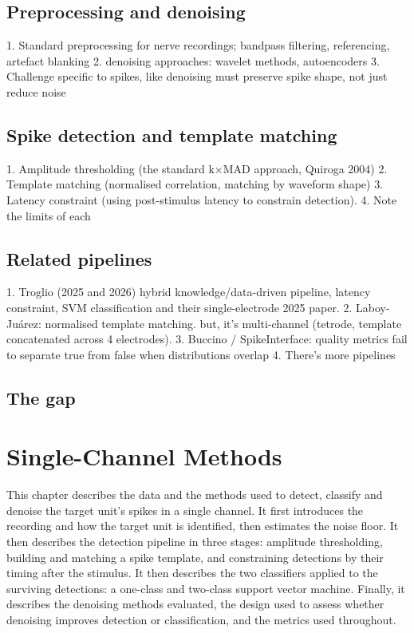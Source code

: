 \documentclass[ %
                    author={Daniel Page},
                supervisor={Dr. Andrew Calway},
                    degree={MSc},
                     title={Some Structural Guidelines for Data Science MSc Theses, Including Those With Long Titles that Run Across Multiple Lines on the Front Page},
                  subtitle={And those including an optional subtitle too, for good measure},
                      type={},
                      year={2021}]{dissertation}
\begin{document}
\section{Preprocessing and denoising}
1. Standard preprocessing for nerve recordings; bandpass filtering, referencing, artefact blanking 
2. denoising approaches: wavelet methods, autoencoders
3. Challenge specific to spikes, like denoising must preserve spike shape, not just reduce noise
\section{Spike detection and template matching}
1. Amplitude thresholding (the standard k×MAD approach, Quiroga 2004)
2. Template matching (normalised correlation, matching by waveform shape)
3. Latency constraint (using post-stimulus latency to constrain detection).
4. Note the limits of each 
\section{Related pipelines}
1. Troglio (2025 and 2026) hybrid knowledge/data-driven pipeline, latency constraint, SVM classification and their single-electrode 2025 paper.
2. Laboy-Juárez: normalised template matching. but, it's multi-channel (tetrode, template concatenated across 4 electrodes).
3. Buccino / SpikeInterface: quality metrics fail to separate true from false when distributions overlap
4. There's more pipelines 
\section{The gap}

\chapter{Single-Channel Methods}
This chapter describes the data and the methods used to detect, classify and denoise the target unit's spikes in a single channel. It first introduces the recording and how the target unit is identified, then estimates the noise floor. It then describes the detection pipeline in three stages: amplitude thresholding, building and matching a spike template, and constraining detections by their timing after the stimulus. It then describes the two classifiers applied to the surviving detections: a one-class and two-class support vector machine.  Finally, it describes the denoising methods evaluated, the design used to assess whether denoising improves detection or classification, and the metrics used throughout.  
\end{document}

